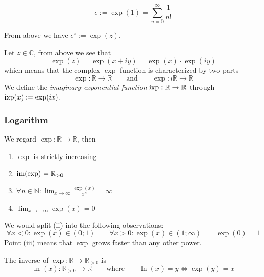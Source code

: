 \begin{definition}
   \[e := \exp(1) = \sum_{n=0}^\infty \frac{1}{n!}\]
\end{definition}
\begin{remark}[Notation]
   From above we have \(e^z := \exp(z)\).
\end{remark}

Let \(z \in \mathbb{C}\), from above we see that
\[\exp(z) = \exp(x + iy) = \exp(x) \cdot \exp(iy)\]
which means that the complex \(\exp\) function is characterized by two parts
\[\exp: \mathbb{R} \to \mathbb{R} \qquad\text{and}\qquad \exp: i\mathbb{R} \to \mathbb{R}\]
We define the \emph{imaginary exponential function} \(\operatorname{ixp}: \mathbb{R} \to \mathbb{R}\) through \(\operatorname{ixp}(x) := \exp(ix)\).

\newpage

\subsubsection{Logarithm}
\begin{proposition}
   We regard \(\exp: \mathbb{R} \to \mathbb{R}\), then
   \begin{enumerate}[label=\roman*, align=Center]
      \item \(\exp\) is strictly increasing
      \item \(\operatorname{im}(\exp) = \mathbb{R}_{>0}\)
      \item \(\forall n \in \mathbb{N}: \lim_{x \to \infty} \frac{\exp(x)}{x^n} = \infty\)
      \item \(\lim_{x \to -\infty} \exp(x) = 0\)
   \end{enumerate}
\end{proposition}
\begin{remark}[Intuition]
   We would split (ii) into the following observations:
   \[\forall x < 0: \exp(x) \in (0; 1) \qquad \forall x > 0: \exp(x) \in (1; \infty) \qquad \exp(0) = 1\]
   Point (iii) means that \(\exp\) grows faster than any other power.
\end{remark}

\begin{definition}[Logarithm]
   The inverse of \(\exp: \mathbb{R} \to \mathbb{R}_{>0}\) is
   \[\ln(x): \mathbb{R}_{>0} \to \mathbb{R} \qquad\text{where}\qquad \ln(x) = y \iff \exp(y) = x\]
\end{definition}

